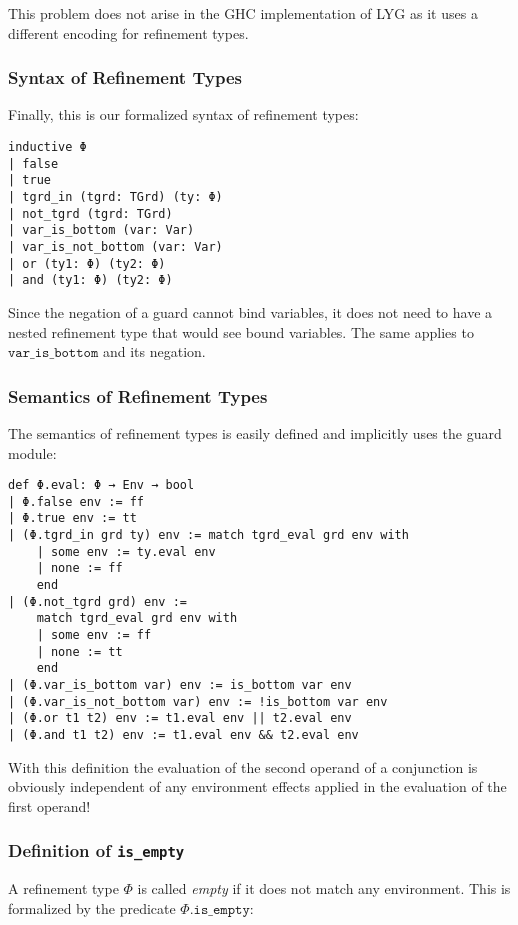 This problem does not arise in the GHC implementation of LYG as it uses a different encoding for refinement types.

\subsubsection{Syntax of Refinement Types}

Finally, this is our formalized syntax of refinement types:

\begin{verbatim}
inductive Φ
| false
| true
| tgrd_in (tgrd: TGrd) (ty: Φ)
| not_tgrd (tgrd: TGrd)
| var_is_bottom (var: Var)
| var_is_not_bottom (var: Var)
| or (ty1: Φ) (ty2: Φ)
| and (ty1: Φ) (ty2: Φ)
\end{verbatim}

Since the negation of a guard cannot bind variables,
it does not need to have a nested refinement type that would see bound variables.
The same applies to $\mathtt{var\_is\_bottom}$ and its negation.

\subsubsection{Semantics of Refinement Types}

The semantics of refinement types is easily defined and implicitly uses the guard module:

\begin{verbatim}
def Φ.eval: Φ → Env → bool
| Φ.false env := ff
| Φ.true env := tt
| (Φ.tgrd_in grd ty) env := match tgrd_eval grd env with
    | some env := ty.eval env
    | none := ff
    end
| (Φ.not_tgrd grd) env :=
    match tgrd_eval grd env with
    | some env := ff
    | none := tt
    end
| (Φ.var_is_bottom var) env := is_bottom var env
| (Φ.var_is_not_bottom var) env := !is_bottom var env
| (Φ.or t1 t2) env := t1.eval env || t2.eval env
| (Φ.and t1 t2) env := t1.eval env && t2.eval env
\end{verbatim}

With this definition the evaluation of the second operand of a conjunction is obviously independent
of any environment effects applied in the evaluation of the first operand!

\subsubsection{Definition of \texttt{is\_empty}}

A refinement type $\Phi$ is called \textit{empty} if it does not match any environment.
This is formalized by the predicate $\Phi\mathtt{.is\_empty}$:

